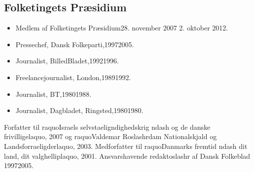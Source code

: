 \documentclass[11pt, a4paper]{awesome-cv}
\begin{document}
\begin{cvletter}
\subsection*{Folketingets Præsidium}
\begin{itemize}
\item Medlem af Folketingets Præsidium28. november 2007  2. oktober 2012.
\end{itemize}
\begin{itemize}
\item Pressechef, Dansk Folkeparti,19972005.
\item Journalist, BilledBladet,19921996.
\item Freelancejournalist, London,19891992.
\item Journalist, BT,19801988.
\item Journalist, Dagbladet, Ringsted,19801980.
\end{itemize}
Forfatter til raquoIsraels selvstaeligndighedskrig ndash og de danske frivilligelaquo, 2007 og raquoValdemar Roslashrdam  Nationalskjald og Landsforraeligderlaquo, 2003. Medforfatter til raquoDanmarks fremtid ndash dit land, dit valghelliplaquo, 2001.  Ansvarshavende redaktoslashr af Dansk Folkeblad 19972005.

\end{cvletter}
\end{document}
